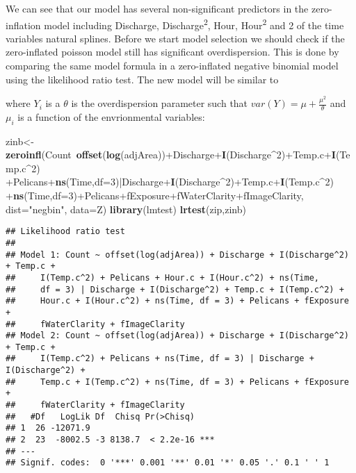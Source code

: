 \documentclass[]{article}
\newenvironment{Shaded}{\begin{snugshade}}{\end{snugshade}}
\newcommand{\KeywordTok}[1]{\textcolor[rgb]{0.13,0.29,0.53}{\textbf{{#1}}}}
\newcommand{\DataTypeTok}[1]{\textcolor[rgb]{0.13,0.29,0.53}{{#1}}}
\newcommand{\DecValTok}[1]{\textcolor[rgb]{0.00,0.00,0.81}{{#1}}}
\newcommand{\StringTok}[1]{\textcolor[rgb]{0.31,0.60,0.02}{{#1}}}
\newcommand{\NormalTok}[1]{{#1}}
\begin{document}
We can see that our model has several non-significant predictors in the
zero-inflation model including Discharge, Discharge\textsuperscript{2},
Hour, Hour\textsuperscript{2} and 2 of the time variables natural
splines. Before we start model selection we should check if the
zero-inflated poisson model still has significant overdispersion. This
is done by comparing the same model formula in a zero-inflated negative
binomial model using the likelihood ratio test. The new model will be
similar to

where \(Y_i\) is a \(\theta\) is the overdispersion parameter such that
\(var(Y) = \mu + \frac{\mu^{2}}{\theta}\) and \(\mu_i\) is a function of
the envrionmental variables:

\begin{Shaded}
\begin{Highlighting}[]
\NormalTok{zinb<-}\KeywordTok{zeroinfl}\NormalTok{(Count~}\KeywordTok{offset}\NormalTok{(}\KeywordTok{log}\NormalTok{(adjArea))+Discharge+}\KeywordTok{I}\NormalTok{(Discharge^}\DecValTok{2}\NormalTok{)+Temp.c+}\KeywordTok{I}\NormalTok{(Temp.c^}\DecValTok{2}\NormalTok{)}
               \NormalTok{+Pelicans+}\KeywordTok{ns}\NormalTok{(Time,}\DataTypeTok{df=}\DecValTok{3}\NormalTok{)|Discharge+}\KeywordTok{I}\NormalTok{(Discharge^}\DecValTok{2}\NormalTok{)+Temp.c+}\KeywordTok{I}\NormalTok{(Temp.c^}\DecValTok{2}\NormalTok{)}
               \NormalTok{+}\KeywordTok{ns}\NormalTok{(Time,}\DataTypeTok{df=}\DecValTok{3}\NormalTok{)+Pelicans+fExposure+fWaterClarity+fImageClarity,}
               \DataTypeTok{dist=}\StringTok{"negbin"}\NormalTok{, }\DataTypeTok{data=}\NormalTok{Z)}
\KeywordTok{library}\NormalTok{(lmtest)}
\KeywordTok{lrtest}\NormalTok{(zip,zinb)}
\end{Highlighting}
\end{Shaded}

\begin{verbatim}
## Likelihood ratio test
## 
## Model 1: Count ~ offset(log(adjArea)) + Discharge + I(Discharge^2) + Temp.c + 
##     I(Temp.c^2) + Pelicans + Hour.c + I(Hour.c^2) + ns(Time, 
##     df = 3) | Discharge + I(Discharge^2) + Temp.c + I(Temp.c^2) + 
##     Hour.c + I(Hour.c^2) + ns(Time, df = 3) + Pelicans + fExposure + 
##     fWaterClarity + fImageClarity
## Model 2: Count ~ offset(log(adjArea)) + Discharge + I(Discharge^2) + Temp.c + 
##     I(Temp.c^2) + Pelicans + ns(Time, df = 3) | Discharge + I(Discharge^2) + 
##     Temp.c + I(Temp.c^2) + ns(Time, df = 3) + Pelicans + fExposure + 
##     fWaterClarity + fImageClarity
##   #Df   LogLik Df  Chisq Pr(>Chisq)    
## 1  26 -12071.9                         
## 2  23  -8002.5 -3 8138.7  < 2.2e-16 ***
## ---
## Signif. codes:  0 '***' 0.001 '**' 0.01 '*' 0.05 '.' 0.1 ' ' 1
\end{verbatim}
\end{document}
